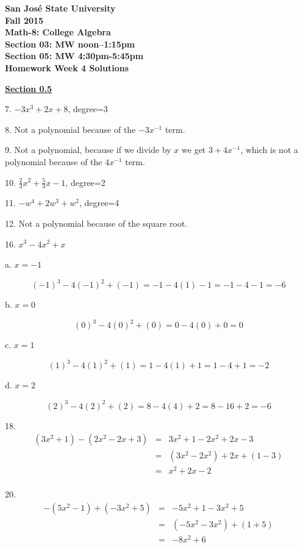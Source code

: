 \documentclass[letterpaper]{article}
\begin{document}
\begin{center}
\bfseries
San Jos\'{e} State University \\
Fall 2015 \\
Math-8: College Algebra \\
Section 03: MW noon--1:15pm \\
Section 05: MW 4:30pm-5:45pm \\
\bigskip
Homework Week 4 Solutions
\end{center}

\underline{\textbf{Section 0.5}}

\bigskip

7. $-3x^3+2x+8$, degree=3

\bigskip

8. Not a polynomial because of the $-3x^{-1}$ term.

\bigskip

9. Not a polynomial, because if we divide by $x$ we get $3+4x^{-1}$, which is
not a polynomial because of the $4x^{-1}$ term.

\bigskip

10. $\frac{2}{3}x^2+\frac{5}{3}x-1$, degree=2

\bigskip

11. $-w^4+2w^3+w^2$, degree=4

\bigskip

12. Not a polynomial because of the square root.

\bigskip

16. $x^3-4x^2+x$

\bigskip

a. $x=-1$

\[(-1)^3-4(-1)^2+(-1)=-1-4(1)-1=-1-4-1=-6\]

b. $x=0$

\[(0)^3-4(0)^2+(0)=0-4(0)+0=0\]

c. $x=1$

\[(1)^3-4(1)^2+(1)=1-4(1)+1=1-4+1=-2\]

d. $x=2$

\[(2)^3-4(2)^2+(2)=8-4(4)+2=8-16+2=-6\]

18.
\begin{eqnarray*}
(3x^2+1)-(2x^2-2x+3) &=& 3x^2+1-2x^2+2x-3 \\
                    &=& (3x^2-2x^2)+2x+(1-3) \\
                    &=& x^2+2x-2 \\
\end{eqnarray*}

20.
\begin{eqnarray*}
-(5x^2-1)+(-3x^2+5) &=& -5x^2+1-3x^2+5 \\
                   &=& (-5x^2-3x^2)+(1+5) \\
                   &=& -8x^2+6 \\
\end{eqnarray*}
\end{document}
